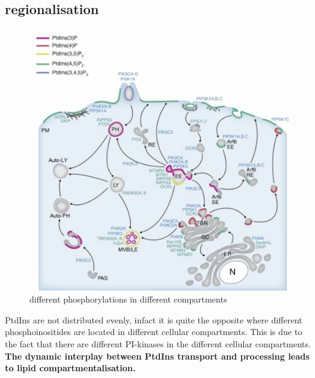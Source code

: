 \documentclass[../main.tex]{subfiles}
\begin{document}
\subsection{regionalisation}
\begin{figure}[H]
    \centering
    \includegraphics[width=1\linewidth]{regionalization.png}
    \caption{different phosphorylations in different compartments}
    \label{fig:enter-label}
\end{figure}
PtdIns are not distributed evenly, infact it is quite the opposite where different phosphoinositides are located in different cellular compartments. This is due to the fact that there are different PI-kinases in the different cellular compartments.  \textbf{The dynamic interplay 
between PtdIns transport and 
processing leads to lipid 
compartmentalisation.}
\end{document}

